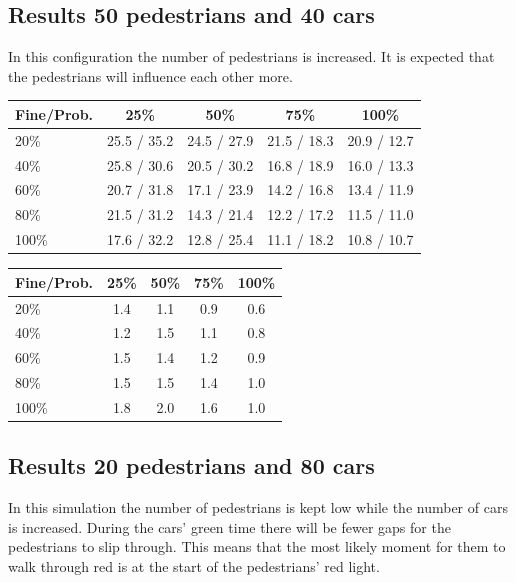 \documentclass[a4paper]{article}
\begin{document}
\subsection{Results 50 pedestrians and 40 cars}
In this configuration the number of pedestrians is increased. It is expected that the pedestrians will influence each other more.

\begin{table}[H]
\centering
\begin{tabular}{ l | c c c c }
  Fine\slash Prob. & 25\% & 50\% & 75\% & 100\% \\ 
  \hline
  20\%  & 25.5 / 35.2 & 24.5 / 27.9 & 21.5 / 18.3 & 20.9 / 12.7  \\
  40\%  & 25.8 / 30.6 & 20.5 / 30.2 & 16.8 / 18.9 & 16.0 / 13.3  \\
  60\%  & 20.7 / 31.8 & 17.1 / 23.9 & 14.2 / 16.8 & 13.4 / 11.9  \\
  80\%  & 21.5 / 31.2 & 14.3 / 21.4 & 12.2 / 17.2 & 11.5 / 11.0  \\
  100\% & 17.6 / 32.2 & 12.8 / 25.4 & 11.1 / 18.2 & 10.8 / 10.7  \\
\end{tabular}
\end{table}

\begin{table}[H]
\centering
\begin{tabular}{ l | c c c c }
  Fine\slash Prob. & 25\% & 50\% & 75\% & 100\% \\ 
  \hline
  20\%  & 1.4 & 1.1 & 0.9 & 0.6  \\
  40\%  & 1.2 & 1.5 & 1.1 & 0.8  \\
  60\%  & 1.5 & 1.4 & 1.2 & 0.9  \\
  80\%  & 1.5 & 1.5 & 1.4 & 1.0  \\
  100\% & 1.8 & 2.0 & 1.6 & 1.0  \\
\end{tabular}
\end{table}

\clearpage
\subsection{Results 20 pedestrians and 80 cars}
In this simulation the number of pedestrians is kept low while the number of cars is increased. During the cars' green time there will be fewer gaps for the pedestrians to slip through. This means that the most likely moment for them to walk through red is at the start of the pedestrians' red light.
\end{document}
